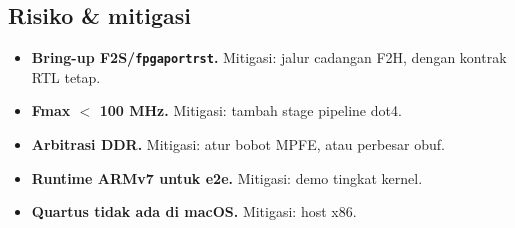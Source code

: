 \documentclass[9pt]{extarticle}
\begin{document}
{\begin{minipage}[t]{0.485\linewidth}
\subsection{Risiko \& mitigasi}
\begin{itemize}
\item \textbf{Bring-up F2S/\texttt{fpgaportrst}.} Mitigasi: jalur cadangan F2H, dengan kontrak RTL tetap.
\item \textbf{Fmax $<$ 100 MHz.} Mitigasi: tambah stage pipeline dot4.
\item \textbf{Arbitrasi DDR.} Mitigasi: atur bobot MPFE, atau perbesar obuf.
\item \textbf{Runtime ARMv7 untuk e2e.} Mitigasi: demo tingkat kernel.
\item \textbf{Quartus tidak ada di macOS.} Mitigasi: host x86.
\end{itemize}
\end{minipage}}
\end{document}
